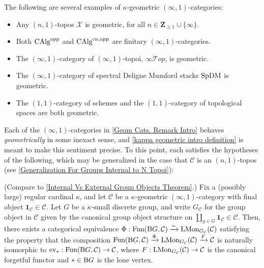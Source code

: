 \documentclass[10pt]{article}
\newcommand{\C}{\mathcal C}
\newcommand{\cT}{\mathcal{T}}
\newcommand{\cX}{\mathcal{X}}
\newcommand{\ZZ}{\mathbb{Z}}
\def\ZZ{{\mathbf Z}}
\theoremstyle{witharg}
\theoremstyle{witharg}
\theoremstyle{witharg2}
\begin{document}
\begin{example}{}\label{Geom Cats. Remark Intro}

   The following are several examples of $\kappa$-geometric $(\infty,1)$-categories: 

    \begin{itemize}
        \item [$(1)$] Any $(n,1)$-topos $\cX$ is geometric, for all $n\in \ZZ_{\geq 1}\cup \{\infty\}$. 
    
        \item [$(2)$] Both $\textnormal{CAlg}^{\textnormal{opp}}$ and $\textnormal{CAlg}^{\textnormal{cn},\textnormal{opp}}$ are finitary $(\infty,1)$-categories.

        \item [$(3)$] The $(\infty,1)$-category of $(\infty,1)$-topoi, $\infty\cT op$, is geometric. 

        \item [$(4)$] The $(\infty,1)$-category of spectral Deligne Mumford stacks $\textnormal{SpDM}$ is geometric. 

        \item [$(5)$] The $(1,1)$-category of schemes and the $(1,1)$-category of topological spaces are both geometric.

    \end{itemize}

    
\end{example}


\noindent Each of the $(\infty,1)$-categories in \ref{Geom Cats. Remark Intro} behaves \emph{geometrically} in some inexact sense, and \ref{kappa geometric intro definition} is meant to make this sentiment precise. To this point, each satisfies the hypotheses of the following, which may be generalized in the case that $\C$ is an $(n,1)$-topos (see \ref{Generalization For Groups Internal to N Topoi}):


\begin{proposition}{}\label{Intro of Internal Vs External Group Objects Theorem}

    (Compare to \ref{Internal Vs External Group Objects Theorem}.) Fix a (possibly large) regular cardinal $\kappa$, and let $\C$ be a $\kappa$-geometric $(\infty,1)$-category with final object $\bm{1}_\C\in \C$. Let $G$ be a $\kappa$-small discrete group, and write $G_\C$ for the group object in $\C$ given by the canonical group object structure on $\coprod_{g\in G}\bm{1}_\C\in \C$. Then, there exists a categorical equivalence $\Phi:\textnormal{Fun}(\textnormal{B}G,\C)\xrightarrow{\sim} \textnormal{LMon}_{G_\C}(\C)$ satisfying the property that the composition $\textnormal{Fun}(\textnormal{B}G,\C)\xrightarrow{\Phi} \textnormal{LMon}_{G_\C}(\C)\xrightarrow{F}\C$ is naturally isomorphic to $\textnormal{ev}_*:\textnormal{Fun}(\textnormal{B}G,\C)\rightarrow \C$, where $F:\textnormal{LMon}_{G_\C}(\C)\rightarrow \C$ is the canonical forgetful functor and $*\in \textnormal{B}G$ is the lone vertex.

\end{proposition}
\end{document}

